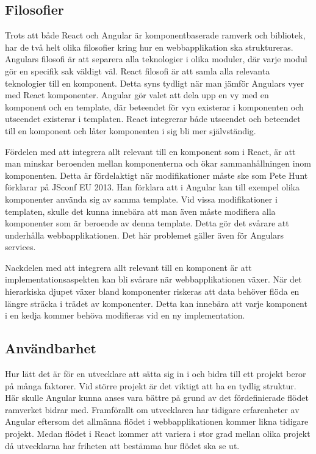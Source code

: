 \subsection{Filosofier}
Trots att både React och Angular är komponentbaserade ramverk och bibliotek, har de två helt olika filosofier kring hur en webbapplikation ska struktureras. Angulars filosofi är att separera alla teknologier i olika moduler, där varje modul gör en specifik sak väldigt väl. React filosofi är att samla alla relevanta teknologier till en komponent. Detta syns tydligt när man jämför Angulars vyer med React komponenter. Angular gör valet att dela upp en vy med en komponent och en template, där beteendet för vyn existerar i komponenten och utseendet existerar i templaten. React integrerar både utseendet och beteendet till en komponent och låter komponenten i sig bli mer självständig. 

Fördelen med att integrera allt relevant till en komponent som i React, är att man minskar beroenden mellan komponenterna och ökar sammanhållningen inom komponenten. Detta är fördelaktigt när modifikationer måste ske som Pete Hunt förklarar på JSconf EU 2013.\cite{JSConf} Han förklara att i Angular kan till exempel olika komponenter använda sig av samma template. Vid vissa modifikationer i templaten, skulle det kunna innebära att man även måste modifiera alla komponenter som är beroende av denna template. Detta gör det svårare att underhålla webbapplikationen. Det här problemet gäller även för Angulars services.

Nackdelen med att integrera allt relevant till en komponent är att implementationsaspekten kan bli svårare när webbapplikationen växer. När det hierarkiska djupet växer bland komponenter riskeras att data behöver flöda en längre sträcka i trädet av komponenter. Detta kan innebära att varje komponent i en kedja kommer behöva modifieras vid en ny implementation.


\subsection{Användbarhet}
Hur lätt det är för en utvecklare att sätta sig in i och bidra till ett projekt beror på många faktorer. Vid större projekt är det viktigt att ha en tydlig struktur. Här skulle Angular kunna anses vara bättre på grund av det fördefinierade flödet ramverket bidrar med. Framförallt om utvecklaren har tidigare erfarenheter av Angular eftersom det allmänna flödet i webbapplikationen kommer likna tidigare projekt. Medan flödet i React kommer att variera i stor grad mellan olika projekt då utvecklarna har friheten att bestämma hur flödet ska se ut. 

